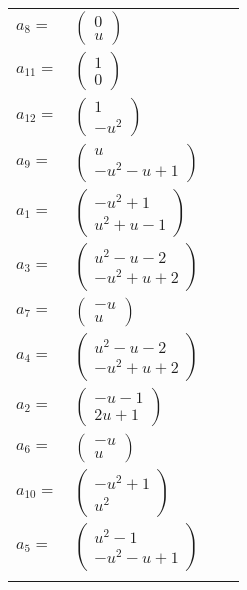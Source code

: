 \documentclass[1p]{elsarticle_modified}
\theoremstyle{definition}
\begin{document}
\begin{tabular}{m{7pt} m{180pt} m{7pt} m{180pt} }
\flushright $a_{8}=$&$\begin{pmatrix}0\\u\end{pmatrix}$ \\
\flushright $a_{11}=$&$\begin{pmatrix}1\\0\end{pmatrix}$ \\
\flushright $a_{12}=$&$\begin{pmatrix}1\\- u^2\end{pmatrix}$ \\
\flushright $a_{9}=$&$\begin{pmatrix}u\\- u^2- u+1\end{pmatrix}$ \\
\flushright $a_{1}=$&$\begin{pmatrix}- u^2+1\\u^2+u-1\end{pmatrix}$ \\
\flushright $a_{3}=$&$\begin{pmatrix}u^2- u-2\\- u^2+u+2\end{pmatrix}$ \\
\flushright $a_{7}=$&$\begin{pmatrix}- u\\u\end{pmatrix}$ \\
\flushright $a_{4}=$&$\begin{pmatrix}u^2- u-2\\- u^2+u+2\end{pmatrix}$ \\
\flushright $a_{2}=$&$\begin{pmatrix}- u-1\\2 u+1\end{pmatrix}$ \\
\flushright $a_{6}=$&$\begin{pmatrix}- u\\u\end{pmatrix}$ \\
\flushright $a_{10}=$&$\begin{pmatrix}- u^2+1\\u^2\end{pmatrix}$ \\
\flushright $a_{5}=$&$\begin{pmatrix}u^2-1\\- u^2- u+1\end{pmatrix}$\\&\end{tabular}
\end{document}
